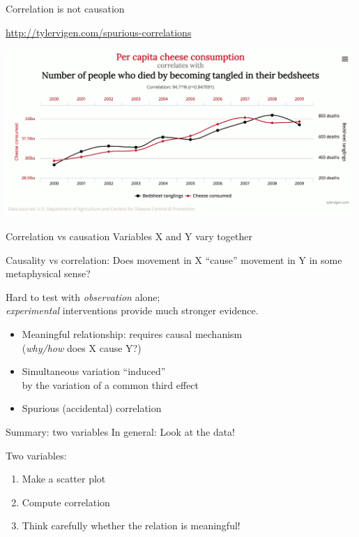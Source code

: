 \documentclass[aspectratio=169,usenames,dvipsnames]{beamer}
\begin{document}
\begin{frame}{Correlation is not causation}
\begin{reference}\vspace{1em}
    \url{http://tylervigen.com/spurious-correlations}
\end{reference}
\includegraphics[width=0.99\textwidth]{fig/cheese}
\end{frame}

\begin{frame}{Correlation vs causation}
Variables X and Y vary together

\begin{block}{Causality vs correlation:}
Does movement in X ``cause''
movement in Y in some metaphysical sense?
\end{block}

Hard to test with \emph{observation} alone;\\
\emph{experimental} interventions provide much stronger evidence.
\pause

\begin{itemize}
    \item Meaningful relationship: requires causal mechanism \\
        (\emph{why/how} does X cause Y?)
    \item Simultaneous variation ``induced'' \\
        by the variation of a common third effect
    \item Spurious (accidental) correlation
\end{itemize}
\end{frame}

\begin{frame}{Summary: two variables}
In general: Look at the data! 

\vspace{1em}
Two  variables:
\begin{enumerate}
    \item Make a scatter plot
    \item Compute correlation
    \item Think carefully whether the relation is meaningful!
\end{enumerate}
\end{frame}
\end{document}
